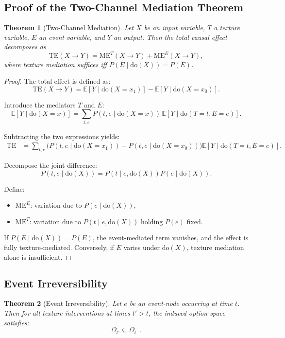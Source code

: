 \documentclass[11pt]{article}
\newtheorem{theorem}{Theorem}
\theoremstyle{remark}
\newcommand{\Do}{\mathrm{do}}
\begin{document}
\subsection{Proof of the Two-Channel Mediation Theorem}

\begin{theorem}[Two-Channel Mediation]
Let $X$ be an input variable, $T$ a texture variable, $E$ an event
variable, and $Y$ an output. Then the total causal effect decomposes as
\[
\mathrm{TE}(X \to Y) = \mathrm{ME}^T(X \to Y) + \mathrm{ME}^E(X \to Y),
\]
where texture mediation suffices iff $P(E \mid \Do(X)) = P(E)$.
\end{theorem}

\begin{proof}
The total effect is defined as:
\[
\mathrm{TE}(X \to Y)
= \mathbb{E}[Y \mid \Do(X=x_1)] - \mathbb{E}[Y \mid \Do(X=x_0)].
\]

Introduce the mediators $T$ and $E$:
\[
\mathbb{E}[Y \mid \Do(X=x)]
= \sum_{t,e} P(t,e \mid \Do(X=x)) \, \mathbb{E}[Y \mid \Do(T=t,E=e)].
\]

Subtracting the two expressions yields:
\begin{align*}
\mathrm{TE}
&= \sum_{t,e} \Big(
P(t,e \mid \Do(X=x_1)) - P(t,e \mid \Do(X=x_0))
\Big)\mathbb{E}[Y \mid \Do(T=t,E=e)].
\end{align*}

Decompose the joint difference:
\[
P(t,e \mid \Do(X))
= P(t \mid e, \Do(X)) P(e \mid \Do(X)).
\]

Define:
\begin{itemize}
\item $\mathrm{ME}^E$: variation due to $P(e \mid \Do(X))$,
\item $\mathrm{ME}^T$: variation due to $P(t \mid e, \Do(X))$ holding
$P(e)$ fixed.
\end{itemize}

If $P(E \mid \Do(X)) = P(E)$, the event-mediated term vanishes, and the
effect is fully texture-mediated. Conversely, if $E$ varies under
$\Do(X)$, texture mediation alone is insufficient.
\end{proof}

\subsection{Event Irreversibility}

\begin{theorem}[Event Irreversibility]
Let $e$ be an event-node occurring at time $t$. Then for all texture
interventions at times $t' > t$, the induced option-space satisfies:
\[
\Omega_{t'} \subseteq \Omega_{t^-}.
\]
\end{theorem}
\end{document}
